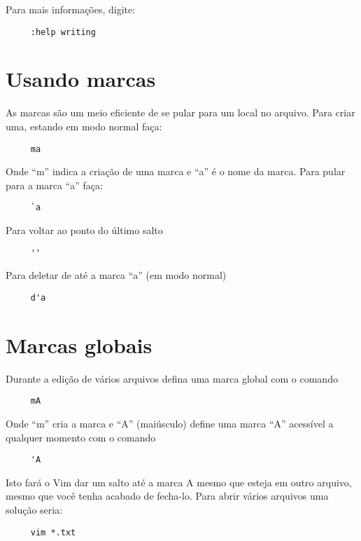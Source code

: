 Para mais informações, digite:

\begin{verbatim}
     :help writing
\end{verbatim}

\section{Usando marcas}
\label{sec:Usando marcas}

As marcas são um meio eficiente de se pular para um local no arquivo. Para
criar uma,  estando em modo normal faça:

\begin{verbatim}
     ma
\end{verbatim}

Onde ``m'' indica a criação de uma marca e ``a'' é o nome da marca. Para pular para a marca ``a'' faça:

\begin{verbatim}
     `a
\end{verbatim}

Para voltar ao ponto do último salto

\begin{verbatim}
     ''
\end{verbatim}

Para deletar de até a marca ``a'' (em modo normal)

\begin{verbatim}
     d'a
\end{verbatim}

\section{Marcas globais}
Durante a edição de vários arquivos defina uma marca global com o comando

\begin{verbatim}
     mA
\end{verbatim}

Onde ``m'' cria a marca e ``A'' (maiúsculo) define uma marca ``A'' acessível a qualquer momento com o comando

\begin{verbatim}
     'A
\end{verbatim}

Isto fará o Vim dar um salto até a marca A mesmo que esteja em outro
arquivo, mesmo que você tenha acabado de fecha-lo. Para abrir vários
arquivos uma solução seria:

\begin{verbatim}
     vim *.txt
\end{verbatim}

